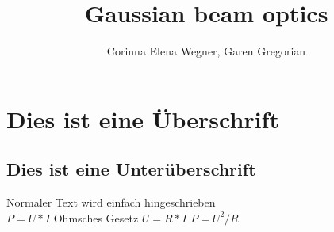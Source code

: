 \documentclass{article}
\begin{document}
\title{Gaussian beam optics}
\author{Corinna Elena Wegner, Garen Gregorian}
\newpage
\tableofcontents
\newpage

\section{Dies ist eine Überschrift}
\subsection{Dies ist eine Unterüberschrift}
Normaler Text wird einfach hingeschrieben\\ 

$ P = U*I $
Ohmsches Gesetz
$ U= R* I$
$P = U^2/R$
\end{document}
